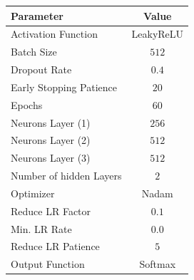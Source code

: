 \documentclass[
  12pt,
  bibliography=totoc,     %
  captions=tableheading,  %
  titlepage=firstiscover, %
]{scrartcl}
\begin{document}
\begin{figure}[H]
    \centering
    \begin{minipage}{0.49\textwidth}
        \centering
        \footnotesize
        \begin{tabular}{l c}
            \toprule
            Parameter & Value \\
            \midrule
            Activation Function     & LeakyReLU \\
            Batch Size              & $512$     \\
            Dropout Rate            & $0.4$     \\
            Early Stopping Patience & $20$      \\
            Epochs                  & $60$      \\
            Neurons Layer (1)       & $256$     \\
            Neurons Layer (2)       & $512$     \\
            Neurons Layer (3)       & $512$     \\
            Number of hidden Layers & $2$       \\
            Optimizer               & Nadam     \\
            Reduce LR Factor        & $0.1$     \\
            Min. LR Rate            & $0.0$     \\
            Reduce LR Patience      & $5$       \\
            Output Function         & Softmax   \\
            \bottomrule
        \end{tabular}
        \label{tab:my_label_for_table}
    \end{minipage}
    \begin{minipage}{0.49\textwidth}
        \centering

\end{minipage}
\end{figure}
\end{document}
